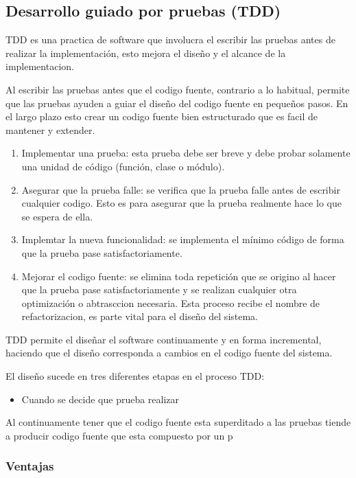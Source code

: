 \subsection{Desarrollo guiado por pruebas (TDD)}
TDD es una practica de software que involucra el escribir las pruebas antes de
realizar la implementación, esto mejora el diseño y el alcance de la implementacion.

Al escribir las pruebas antes que el codigo fuente, contrario a lo habitual, permite que las pruebas ayuden a guiar el diseño del codigo fuente en pequeños pasos. En el largo plazo esto crear un codigo fuente bien estructurado que es facil de mantener y extender.

\begin{enumerate}
\item Implementar una prueba: esta prueba debe ser breve y debe probar
  solamente una unidad de código (función, clase o módulo).
\item Asegurar que la prueba falle: se verifica que la prueba falle antes
  de escribir cualquier codigo. Esto es para asegurar que la prueba realmente
  hace lo que se espera de ella.
\item Implemtar la nueva funcionalidad: se implementa el mínimo código de
  forma que la prueba pase satisfactoriamente.
\item Mejorar el codigo fuente: se elimina toda repetición que se origino al
  hacer que la prueba pase satisfactoriamente y se realizan cualquier otra
  optimización o abtrasccion necesaria. Esta proceso recibe el nombre de
  refactorizacion, es parte vital para el diseño del sistema.
\end{enumerate}

TDD permite el diseñar el software continuamente y en forma incremental, haciendo que el diseño corresponda a cambios en el codigo fuente del sistema.

El diseño sucede en tres diferentes etapas en el proceso TDD:
\begin{itemize}
  \item Cuando se decide que prueba realizar 
\end{itemize}

Al continuamente tener que el codigo fuente esta superditado a las pruebas tiende
a producir codigo fuente que esta compuesto por un p
\subsubsection{Ventajas}

